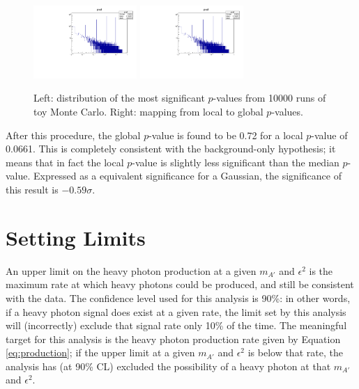 \begin{figure}[ht]
\begin{center}
    \includegraphics[width=0.35\textwidth,page=1,angle=-90]{vertexing/figs/trials}
    \includegraphics[width=0.35\textwidth,page=6,angle=-90]{vertexing/figs/trials}
\end{center}
\caption{Left: distribution of the most significant $p$-values from 10000 runs of toy Monte Carlo. Right: mapping from local to global $p$-values.}
    \label{fig:trials}
\end{figure}

After this procedure, the global $p$-value is found to be 0.72 for a local $p$-value of 0.0661.
This is completely consistent with the background-only hypothesis; it means that in fact the local $p$-value is slightly less significant than the median $p$-value.
Expressed as a equivalent significance for a Gaussian, the significance of this result is $-0.59\sigma$.

\clearpage
\section{Setting Limits}
\label{sec:limits}
An upper limit on the heavy photon production at a given $m_{A'}$ and $\epsilon^2$ is the maximum rate at which heavy photons could be produced, and still be consistent with the data.
The confidence level used for this analysis is 90\%: in other words, if a heavy photon signal does exist at a given rate, the limit set by this analysis will (incorrectly) exclude that signal rate only 10\% of the time.
The meaningful target for this analysis is the heavy photon production rate given by Equation \ref{eq:production}; if the upper limit at a given $m_{A'}$ and $\epsilon^2$ is below that rate, the analysis has (at 90\% CL) excluded the possibility of a heavy photon at that $m_{A'}$ and $\epsilon^2$.

